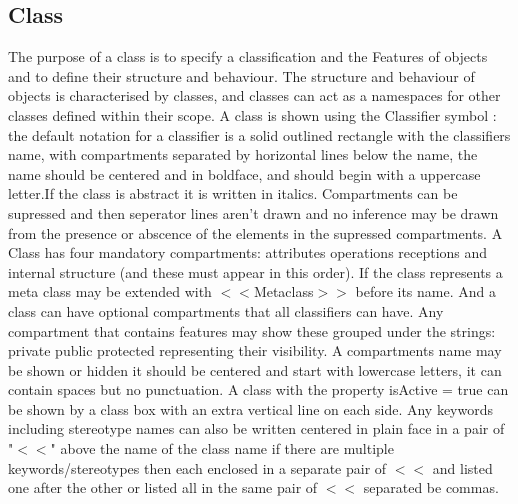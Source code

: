 \subsection{Class}
The purpose of a class is to specify a classification and the Features of objects and to define their structure and behaviour. The structure and behaviour of objects is characterised by classes, and classes can act as a namespaces for other classes defined within their scope. A class is shown using the Classifier symbol : the default notation for a classifier is a solid outlined rectangle with the classifiers name, with compartments separated by horizontal lines below the name, the name should be centered and in boldface, and should begin with a uppercase letter.If the class is abstract it is written in italics. Compartments can be supressed and then seperator lines aren't drawn and no inference may be drawn from the presence or abscence of the elements in the supressed compartments. A Class has four mandatory compartments: attributes operations receptions and internal structure (and these must appear in this order). If the class represents a meta class may be extended with $<<$Metaclass$>>$ before its name. And a class can have optional compartments that all classifiers can have. Any compartment that contains features may show these grouped under the strings: private public protected representing their visibility. A compartments name may be shown or hidden it should be centered and start with lowercase letters, it can contain spaces but no punctuation. A class with the property isActive = true can be shown by a class box with an extra vertical line on each side. Any keywords including stereotype names can also be written centered in plain face in a pair of "$<<$" above the name of the class name if there are multiple keywords/stereotypes then each enclosed in a separate pair of $<<$ and listed one after the other or listed all in the same pair of $<<$ separated be commas. \cite{OMG-UML_Classes}\cite{uwlaxInformalSemanticsClass}
